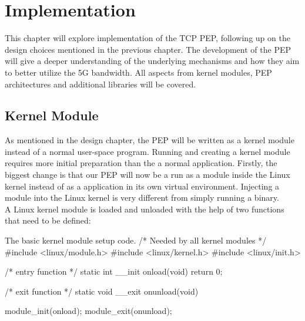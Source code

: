 \documentclass[a4paper,english, 11pt]{report}
\begin{document}



\chapter{Implementation}
This chapter will explore implementation of the TCP PEP, following up on the design choices mentioned in the previous chapter. The development of the PEP will give a deeper understanding of the underlying mechanisms and how they aim to better utilize the 5G bandwidth. All aspects from kernel modules, PEP architectures and additional libraries will be covered.

\section{Kernel Module}
As mentioned in the design chapter, the PEP will be written as a kernel module instead of a normal user-space program. Running and creating a kernel module requires more initial preparation than the a normal application. Firstly, the biggest change is that our PEP will now be a run as a module inside the Linux kernel instead of as a application in its own virtual environment. Injecting a module into the Linux kernel is very different from simply running a binary.\\

A Linux kernel module is loaded and unloaded with the help of two functions that need to be defined:\\

\begin{autonumlstlisting}[label=lst:module_example]{The basic kernel module setup code.}
/* Needed by all kernel modules */
#include <linux/module.h> 
#include <linux/kernel.h>
#include <linux/init.h>

/* entry function */
static int __init onload(void) {
    return 0;
}

/* exit function */
static void __exit onunload(void) {
    
}

module_init(onload);
module_exit(onunload);
\end{autonumlstlisting}
\end{document}
